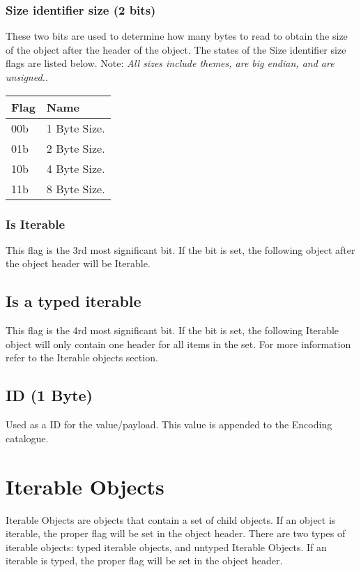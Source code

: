 \documentclass[11pt]{article}
\begin{document}
\subsubsection{Size identifier size (2 bits)}
These two bits are used to determine how many bytes to read to obtain the size of the object after the header of the object. The states of the Size identifier size flags are listed below. Note: \textit{All sizes include themes, are big endian, and are unsigned.}.

\begin{center}
  \begin{tabular}{ |l|l| }
    \hline
    \textbf{Flag} & \textbf{Name} \\
    \hline
    00b           & 1 Byte Size.  \\
    01b           & 2 Byte Size.  \\
    10b           & 4 Byte Size.  \\
    11b           & 8 Byte Size.  \\
    \hline
  \end{tabular}
\end{center}

\subsubsection{Is Iterable}
This flag is the 3rd most significant bit. If the bit is set, the following object after the object header will be Iterable.

\subsection{Is a typed iterable}
This flag is the 4rd most significant bit. If the bit is set, the following Iterable object will only contain one header for all items in the set. For more information refer to the Iterable objects section.


\subsection{ID (1 Byte)}
Used as a ID for the value/payload. This value is appended to the Encoding catalogue.

\section{Iterable Objects}
Iterable Objects are objects that contain a set of child objects. If an object is iterable, the proper flag will be set in the object header. There are two types of iterable objects: typed iterable objects, and untyped Iterable Objects. If an iterable is typed, the proper flag will be set in the object header.
\end{document}
